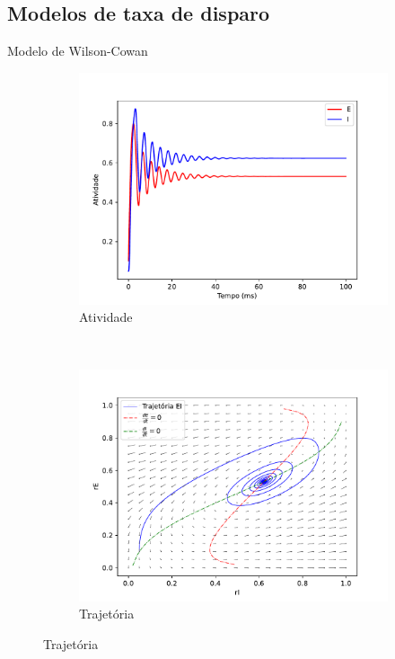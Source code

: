 \subsection{Modelos de taxa de disparo}
\begin{frame}{Modelo de Wilson-Cowan}
	\begin{figure}
		\centering
		\caption{Comportamento das simulações do modelo de Wilson-Cowan}
		\label{fig:wilson_cowan}
		\begin{subfigure}[b]{0.3\linewidth}
			\caption{Atividade}
			\label{fig:ww_atividade}
			\includegraphics[width=\textwidth]{figs/ww_atividade}
		\end{subfigure}
		~
		\begin{subfigure}[b]{0.3\linewidth}
			\caption{Trajetória}
			\label{fig:ww_trajetoria}
			\includegraphics[width=\textwidth]{figs/ww_trajetoria}

\end{subfigure}
\end{figure}
\end{frame}
